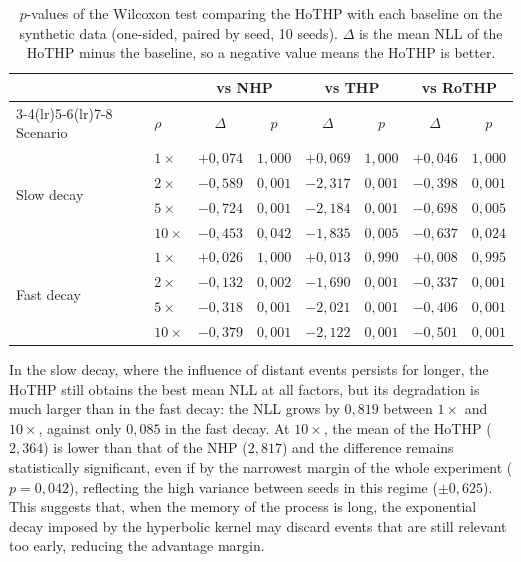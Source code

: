 \begin{table}[h!]
\centering
\caption{$p$-values of the Wilcoxon test comparing the HoTHP with each baseline on the synthetic data (one-sided, paired by seed, 10 seeds). $\Delta$ is the mean NLL of the HoTHP minus the baseline, so a negative value means the HoTHP is better.}
\label{tab:pvalues-sinteticos}
\begin{tabular}{llcccccc}
\toprule
 & & \multicolumn{2}{c}{vs NHP} & \multicolumn{2}{c}{vs THP} & \multicolumn{2}{c}{vs RoTHP} \\
\cmidrule(lr){3-4}\cmidrule(lr){5-6}\cmidrule(lr){7-8}
Scenario & $\rho$ & $\Delta$ & $p$ & $\Delta$ & $p$ & $\Delta$ & $p$ \\
\midrule
\multirow{4}{*}{Slow decay}
    & $1\times$  & $+0{,}074$ & $1{,}000$      & $+0{,}069$ & $1{,}000$      & $+0{,}046$ & $1{,}000$ \\
    & $2\times$  & $-0{,}589$ & $0{,}001$  & $-2{,}317$ & $0{,}001$  & $-0{,}398$ & $0{,}001$ \\
    & $5\times$  & $-0{,}724$ & $0{,}001$  & $-2{,}184$ & $0{,}001$  & $-0{,}698$ & $0{,}005$ \\
    & $10\times$ & $-0{,}453$ & $0{,}042$  & $-1{,}835$ & $0{,}005$  & $-0{,}637$ & $0{,}024$ \\
\midrule
\multirow{4}{*}{Fast decay}
    & $1\times$  & $+0{,}026$ & $1{,}000$      & $+0{,}013$ & $0{,}990$      & $+0{,}008$ & $0{,}995$ \\
    & $2\times$  & $-0{,}132$ & $0{,}002$  & $-1{,}690$ & $0{,}001$  & $-0{,}337$ & $0{,}001$ \\
    & $5\times$  & $-0{,}318$ & $0{,}001$  & $-2{,}021$ & $0{,}001$  & $-0{,}406$ & $0{,}001$ \\
    & $10\times$ & $-0{,}379$ & $0{,}001$  & $-2{,}122$ & $0{,}001$  & $-0{,}501$ & $0{,}001$ \\
\bottomrule
\end{tabular}
\end{table}

In the slow decay, where the influence of distant events persists for longer, the HoTHP still obtains the best mean NLL at all factors, but its degradation is much larger than in the fast decay: the NLL grows by $0{,}819$ between $1\times$ and $10\times$, against only $0{,}085$ in the fast decay. At $10\times$, the mean of the HoTHP ($2{,}364$) is lower than that of the NHP ($2{,}817$) and the difference remains statistically significant, even if by the narrowest margin of the whole experiment ($p = 0{,}042$), reflecting the high variance between seeds in this regime ($\pm 0{,}625$). This suggests that, when the memory of the process is long, the exponential decay imposed by the hyperbolic kernel may discard events that are still relevant too early, reducing the advantage margin.

